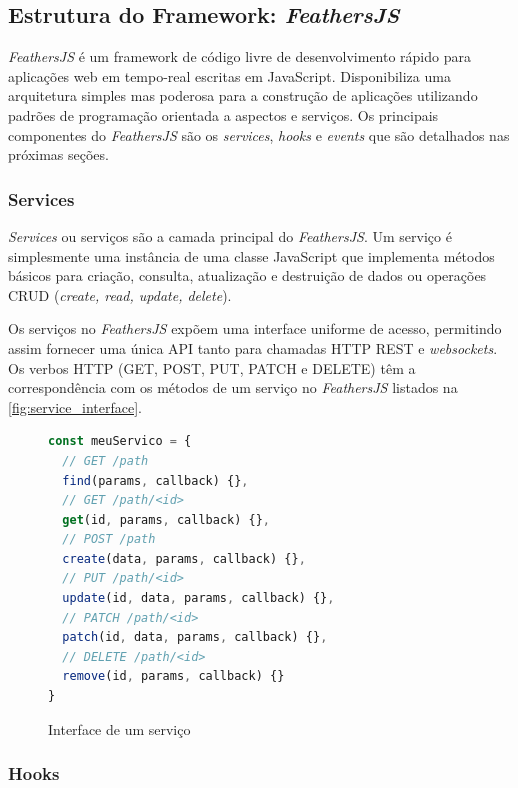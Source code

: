 \subsection{Estrutura do Framework: \textit{FeathersJS}}

\textit{FeathersJS} é um framework de código livre de desenvolvimento rápido para aplicações
web em tempo-real escritas em JavaScript. Disponibiliza uma arquitetura simples mas poderosa
para a construção de aplicações utilizando padrões de programação orientada a aspectos e serviços.
Os principais componentes do \textit{FeathersJS} são os \textit{services}, \textit{hooks} e
\textit{events} que são detalhados nas próximas seções.

\subsubsection{Services}

\textit{Services} ou serviços são a camada principal do \textit{\textit{FeathersJS}}.
Um serviço é simplesmente uma instância de uma classe JavaScript
que implementa métodos básicos para criação, consulta, atualização e
destruição de dados ou operações CRUD (\textit{create, read, update, delete}).

Os serviços no \textit{FeathersJS} expõem uma interface uniforme de acesso, permitindo
assim fornecer uma única API tanto para chamadas HTTP REST e \textit{websockets}.
Os verbos HTTP (GET, POST, PUT, PATCH e DELETE) têm a correspondência com
os métodos de um serviço no \textit{\textit{FeathersJS}} listados na \autoref{fig:service_interface}.

\begin{figure}[h]
\begin{lstlisting}[language=JavaScript]
const meuServico = {
  // GET /path
  find(params, callback) {},
  // GET /path/<id>
  get(id, params, callback) {},
  // POST /path
  create(data, params, callback) {},
  // PUT /path/<id>
  update(id, data, params, callback) {},
  // PATCH /path/<id>
  patch(id, data, params, callback) {},
  // DELETE /path/<id>
  remove(id, params, callback) {}
}
\end{lstlisting}
\caption{Interface de um serviço}
\label{fig:service_interface}
\end{figure}

\subsubsection{Hooks}

